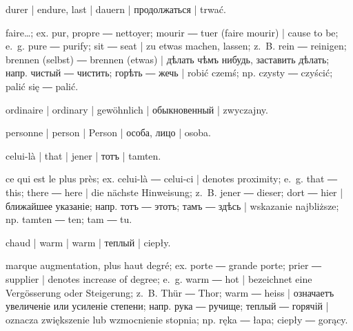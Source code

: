 \begin{ekzvocab}{1em}
 durer | endure, last | dauern | продолжаться | trwać.

 faire\ldots{}; ex.  pur, propre ―  nettoyer;  mourir ―  tuer (faire mourir) | cause to be; e.~g.  pure ―  purify;  sit ―  seat | zu etwas machen, lassen; z.~B.  rein ―  reinigen;  brennen (selbst) ―  brennen (etwas) | дѣлать чѣмъ нибудь, заставить дѣлать; напр.  чистый ―  чистить;  горѣть ―  жечь | robić czemś; np.  czysty ―  czyścić;  palić się ―  palić.

 ordinaire | ordinary | gewöhnlich | обыкновенный | zwyczajny.

 personne | person | Person | особа, лицо | osoba.

 celui-là | that | jener | тотъ | tamten.

 ce qui est le plus près; ex.  celui-là ―  celui-ci | denotes proximity; e.~g.  that ―  this;  there ―  here | die nächste Hinweisung; z.~B.  jener ―  dieser;  dort ―  hier | ближайшее указаніе; напр.  тотъ ―  этотъ;  тамъ ―  здѣсь | wskazanie najbliższe; np.  tamten ―  ten;  tam ―  tu.

 chaud | warm | warm | теплый | ciepły.

 marque augmentation, plus haut degré; ex.  porte ―  grande porte;  prier ―  supplier | denotes increase of degree; e.~g.  warm ―  hot | bezeichnet eine Vergösserung oder Steigerung; z.~B.  Thür ―  Thor;  warm ―  heiss | означаетъ увеличеніе или усиленіе степени; напр.  рука ―  ручище;  теплый ―  горячій | oznacza zwiększenie lub wzmocnienie stopnia; np.  ręka ―  łapa;  ciepły ―  gorący.


\end{ekzvocab}
